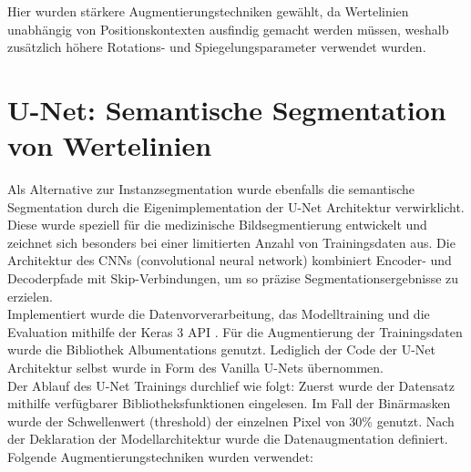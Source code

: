 Hier wurden stärkere Augmentierungstechniken gewählt, da Wertelinien unabhängig von Positionskontexten ausfindig gemacht werden müssen, weshalb zusätzlich höhere Rotations- und Spiegelungsparameter verwendet wurden.


\section{U-Net: Semantische Segmentation von Wertelinien}
\label{ch:unet}

Als Alternative zur Instanzsegmentation wurde ebenfalls die semantische Segmentation durch die Eigenimplementation der U-Net Architektur verwirklicht. Diese wurde speziell für die medizinische Bildsegmentierung entwickelt und zeichnet sich besonders bei einer limitierten Anzahl von Trainingsdaten aus. Die Architektur des CNNs (convolutional neural network) kombiniert Encoder- und Decoderpfade mit Skip-Verbindungen, um so präzise Segmentationsergebnisse zu erzielen.
\\
Implementiert wurde die Datenvorverarbeitung, das Modelltraining und die Evaluation mithilfe der Keras 3 API \cite{chollet2015keras}. Für die Augmentierung der Trainingsdaten wurde die Bibliothek Albumentations \cite{info11020125} genutzt. Lediglich der Code der U-Net Architektur selbst wurde in Form des Vanilla U-Nets \cite{zak2024kerasunet} übernommen.
\\
Der Ablauf des U-Net Trainings durchlief wie folgt:
Zuerst wurde der Datensatz mithilfe verfügbarer Bibliotheksfunktionen eingelesen. Im Fall der Binärmasken wurde der Schwellenwert (threshold) der einzelnen Pixel von 30\% genutzt. Nach der Deklaration der Modellarchitektur wurde die Datenaugmentation definiert. Folgende Augmentierungstechniken wurden verwendet:

